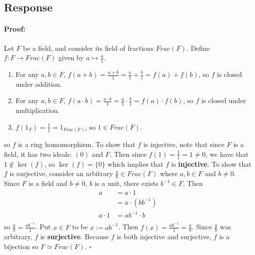 \documentclass [12pt] {article}
\newenvironment{proof}{\paragraph{Proof:}}{\hfill$\square$}
\begin{document}
\subsection*{Response}
\begin{proof}
    Let $F$ be a field, and consider its field of fractions $Frac(F)$. Define $f : F \to Frac(F)$
    given by $a \mapsto \frac{a}{1}$.
    \begin{enumerate}
        \item For any $a, b \in F$,
            $
            f(a + b)
            = \frac{a + b}{1}
            = \frac{a}{1} + \frac{b}{1}
            = f(a) + f(b)
            $,
            so $f$ is closed under addition.
        \item For any
            $a, b \in F$,
            $f(a \cdot b)
            = \frac{a \cdot b}{1}
            = \frac{a}{1} \cdot \frac{b}{1}
            = f(a) \cdot f(b)
            $,
            so $f$ is closed under multiplication.
        \item $f(1_F) = \frac{1}{1} = 1_{Frac(F)}$, so $1 \in Frac(F)$.
    \end{enumerate}
    so $f$ is a ring homomorphism. To show that $f$ is injective, note that since $F$ is a field,
    it has two ideals: $(0)$ and $F$. Then since $f(1) = \frac{1}{1} = 1 \neq 0$, we have that
    $1 \not \in \ker(f)$, so $\ker(f) = \{ 0 \}$ which implies that $f$ is \textbf{injective}. To show that
    $f$ is surjective, consider an arbitrary $\frac{a}{b} \in Frac(F)$ where $a, b \in F$ and
    $b \neq 0$. Since $F$ is a field and $b \neq 0$, $b$ is a unit, there exists $b^{-1} \in F$.
    Then
    \begin{align*}
        a &= a \cdot 1 \\
          &= a \cdot (bb^{-1}) \\
        a \cdot 1 &= ab^{-1} \cdot b \\
    \end{align*}
    so $\frac{a}{b} = \frac{ab^{-1}}{1}$. Put $x \in F$ to be $x := ab^{-1}$. Then
    $f(x) = \frac{ab^{-1}}{1} = \frac{a}{b}$. Since $\frac{a}{b}$ was arbitrary, $f$ is
    \textbf{surjective}.
    Because $f$ is both injective and surjective, $f$ is a bijection so $F \simeq Frac(F)$.
\end{proof}
\newpage
\end{document}
